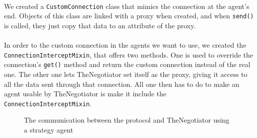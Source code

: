 \paragraph*{}
We created a \texttt{CustomConnection} class that mimics the connection at the agent's end. Objects of this class are linked with a proxy when created, and when \texttt{send()} is called, they just copy that data to an attribute of the proxy.	%

\paragraph*{}
In order to  the custom connection in the agents we want to use, we created the \texttt{ConnectionInterceptMixin}, that offers two methods. One is used to override the connection's \texttt{get()} method and return the custom connection instead of the real one. The other one lets TheNegotiator set itself as the proxy, giving it access to all the data sent through that connection. All one then has to do to make an agent usable by TheNegotiator is make it include the \texttt{ConnectionInterceptMixin}.

\begin{figure}[H]
\centering
{}
\captionsetup{justification=centering}
\caption{The communication between the protocol and TheNegotiator using a strategy agent}
\label{fig:agent-agent_connection}
\end{figure}

